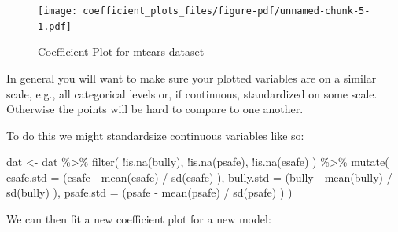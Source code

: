 \documentclass[
  letterpaper,
  DIV=11,
  numbers=noendperiod]{scrreprt}
\newenvironment{Shaded}{}{}
\newcommand{\AttributeTok}[1]{\textcolor[rgb]{0.49,0.56,0.16}{#1}}
\newcommand{\FunctionTok}[1]{\textcolor[rgb]{0.02,0.16,0.49}{#1}}
\newcommand{\NormalTok}[1]{#1}
\newcommand{\OtherTok}[1]{\textcolor[rgb]{0.00,0.44,0.13}{#1}}
\newcommand{\SpecialCharTok}[1]{\textcolor[rgb]{0.25,0.44,0.63}{#1}}
\begin{document}
\begin{figure}[H]

{\centering \texttt{[image: coefficient\_plots\_files/figure-pdf/unnamed-chunk-5-1.pdf]}

}

\caption{Coefficient Plot for mtcars dataset}

\end{figure}%

In general you will want to make sure your plotted variables are on a
similar scale, e.g., all categorical levels or, if continuous,
standardized on some scale. Otherwise the points will be hard to compare
to one another.

To do this we might standardsize continuous variables like so:

\begin{Shaded}
\begin{Highlighting}[]
\NormalTok{dat }\OtherTok{\textless{}{-}}\NormalTok{ dat }\SpecialCharTok{\%\textgreater{}\%}
  \FunctionTok{filter}\NormalTok{( }\SpecialCharTok{!}\FunctionTok{is.na}\NormalTok{(bully), }\SpecialCharTok{!}\FunctionTok{is.na}\NormalTok{(psafe), }\SpecialCharTok{!}\FunctionTok{is.na}\NormalTok{(esafe) ) }\SpecialCharTok{\%\textgreater{}\%}
  \FunctionTok{mutate}\NormalTok{(  }\AttributeTok{esafe.std =}\NormalTok{ (esafe }\SpecialCharTok{{-}} \FunctionTok{mean}\NormalTok{(esafe) }\SpecialCharTok{/} \FunctionTok{sd}\NormalTok{(esafe) ),}
           \AttributeTok{bully.std =}\NormalTok{ (bully }\SpecialCharTok{{-}} \FunctionTok{mean}\NormalTok{(bully) }\SpecialCharTok{/} \FunctionTok{sd}\NormalTok{(bully) ),}
               \AttributeTok{psafe.std =}\NormalTok{ (psafe }\SpecialCharTok{{-}} \FunctionTok{mean}\NormalTok{(psafe) }\SpecialCharTok{/} \FunctionTok{sd}\NormalTok{(psafe) ) )}
\end{Highlighting}
\end{Shaded}

We can then fit a new coefficient plot for a new model:
\end{document}
